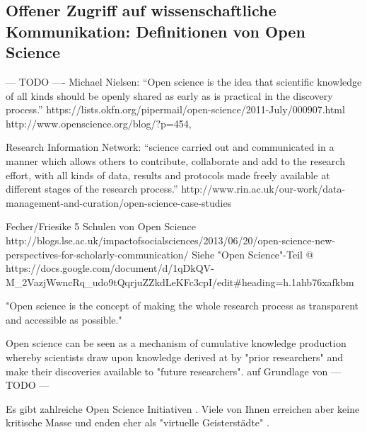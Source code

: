 \subsection{Offener Zugriff auf wissenschaftliche Kommunikation: Definitionen von Open Science}
--- TODO ---- Michael Nielsen: “Open science is the idea that scientific knowledge of all kinds should be openly shared as early as is practical in the discovery process.”  https://lists.okfn.org/pipermail/open-science/2011-July/000907.html
http://www.openscience.org/blog/?p=454,

Research Information Network: “science carried out and communicated in a manner which allows others to contribute, collaborate and add to the research effort, with all kinds of data, results and protocols made freely available at different stages of the research process.” http://www.rin.ac.uk/our-work/data-management-and-curation/open-science-case-studies

Fecher/Friesike 5 Schulen von Open Science http://blogs.lse.ac.uk/impactofsocialsciences/2013/06/20/open-science-new-perspectives-for-scholarly-communication/ 
Siehe "Open Science"-Teil @ https://docs.google.com/document/d/1qDkQV-M_2VazjWwncRq_udo9tQqrjuZZkdLeKFc3cpI/edit#heading=h.1ahb76xafkbm

"Open science is the concept of making the whole research process as transparent and accessible as possible."\cite{Scheliga_2014}

Open science can be seen as a mechanism of cumulative knowledge production whereby scientists draw upon knowledge derived at by "prior researchers" and make their discoveries available to "future researchers". \cite{Scheliga_2014} auf Grundlage von \cite{Mukherjee_2009}
--- TODO ---

Es gibt zahlreiche Open Science Initiativen \cite{Scheliga_2014}. Viele von Ihnen erreichen aber keine kritische Masse \cite{wrap_2010} und enden eher als "virtuelle Geisterstädte" \cite{Nielsen_2011}.

